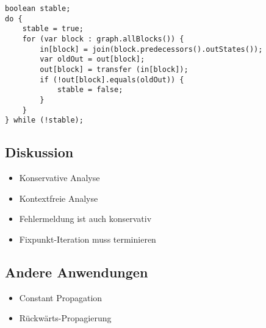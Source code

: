 \begin{lstlisting}
boolean stable;
do {
    stable = true;
    for (var block : graph.allBlocks()) {
        in[block] = join(block.predecessors().outStates());
        var oldOut = out[block];
        out[block] = transfer (in[block]);
        if (!out[block].equals(oldOut)) {
            stable = false;
        }
    }
} while (!stable);
\end{lstlisting}

\subsection{Diskussion}
\begin{itemize}[topsep=0pt]
    \itemsep -0.2em
    \item Konservative Analyse
    \item Kontextfreie Analyse
    \item Fehlermeldung ist auch konservativ
    \item Fixpunkt-Iteration muss terminieren
\end{itemize}

\subsection{Andere Anwendungen}
\begin{itemize}[topsep=0pt]
    \itemsep -0.2em
    \item Constant Propagation
    \item Rückwärts-Propagierung
\end{itemize}